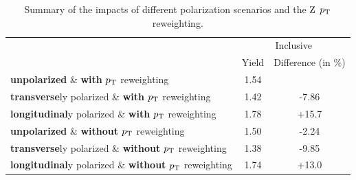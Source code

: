 	\begin{table}[!ht]
	\small
	  \begin{center}
	    \begin{tabular}{lcc}
	    \hline
	        &  \multicolumn{2}{c}{Inclusive}\\ 
	      	\cline{2-3}
	        & Yield & Difference (in $\%$) \\
	        \hline
	        \textbf{unpolarized} \& \textbf{with} $p_{\mathrm{T}}$ reweighting   & 1.54   &    \\
	      	\textbf{transverse}ly polarized \& \textbf{with} $p_{\mathrm{T}}$ reweighting   & 1.42   & -7.86   \\
	      	\textbf{longitudinal}y polarized \& \textbf{with} $p_{\mathrm{T}}$ reweighting   & 1.78   & +15.7   \\
	      	\textbf{unpolarized} \& \textbf{without} $p_{\mathrm{T}}$ reweighting   & 1.50   &   -2.24 \\
	      	\textbf{transverse}ly polarized \& \textbf{without} $p_{\mathrm{T}}$ reweighting   & 1.38   & -9.85   \\
	      	\textbf{longitudinal}y polarized \& \textbf{without} $p_{\mathrm{T}}$ reweighting   & 1.74   & +13.0   \\
	      	\hline
	    \end{tabular}
	    \caption{Summary of the impacts of different polarization scenarios and the $\mathrm{Z}$ $p_{\mathrm{T}}$ reweighting.\label{tab:ZyieldComp}}
	  \end{center}
	\end{table}
	
